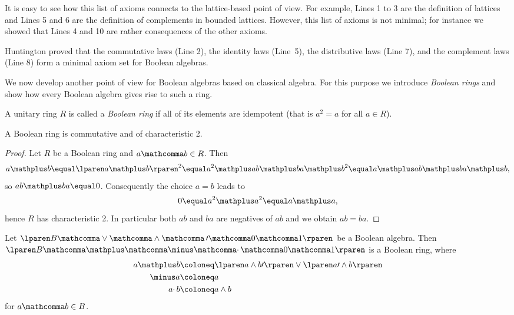 It is easy to see how this list of axioms connects
to the lattice-based point of view.
For example, Lines 1 to 3 are the definition of lattices
and Lines 5 and 6 are the definition of complements in bounded lattices.
However, this list of axioms is not minimal;
for instance we showed that Lines 4 and 10
are rather consequences of the other axioms.

Huntington proved \cite{huntingtion:axiomset_boolean}
that the commutative laws (Line 2), the identity laws (Line~5),
the distributive laws (Line 7), and the complement laws (Line 8)
form a minimal axiom set for Boolean algebras.

\medskip

We now develop another point of view for Boolean algebras
based on classical algebra.
For this purpose we introduce \emph{Boolean rings}
and show how every Boolean algebra
gives rise to such a ring.

\medskip

\begin{definition}
  A unitary ring $R$ is called a \emph{Boolean ring}
  if all of its elements are idempotent
  (that is $a^2 \equal a$ for all $a \in R$).
\end{definition}

\begin{proposition}
\label{prop:boolean_ring}
  A Boolean ring is commutative and of characteristic 2.
\end{proposition}

\begin{proof}
  Let $R$ be a Boolean ring and $a \mathcomma b \in R$.
  Then
  \[
    a \mathplus b
    \equal
    \lparen a \mathplus b \rparen ^2
    \equal
    a ^2 \mathplus ab \mathplus ba \mathplus b ^2
    \equal
    a \mathplus ab \mathplus ba \mathplus b,
  \]
  so $ab \mathplus ba \equal 0$.
  Consequently the choice $a \equal b$ leads to
  \[
    0
    \equal
    a ^2 \mathplus a ^2
    \equal
    a \mathplus a,
  \]
  hence $R$ has characteristic 2.
  In particular both $ab$ and $ba$ are negatives of $ab$
  and we obtain $ab \equal ba$.
\end{proof}

\begin{theorem}
\label{thm:algebra_ring}
  Let
  $\lparen B \mathcomma \vee \mathcomma \wedge \mathcomma \, \prime
  \mathcomma 0 \mathcomma 1 \rparen$
  be a Boolean algebra.
  Then
  $\lparen B \mathcomma \mathplus \mathcomma \minus \mathcomma \cdotp
  \mathcomma 0 \mathcomma 1 \rparen$
  is a Boolean ring,
  where
  \begin{align*}
    a \mathplus b
    &\coloneq
    \lparen a \wedge b \prime \rparen \vee \lparen a \prime \wedge b \rparen\\
    \minus a
    &\coloneq
    a\\
    a \cdotp b
    &\coloneq
    a \wedge b
  \end{align*}
  for $a \mathcomma b \in B$.
\end{theorem}

